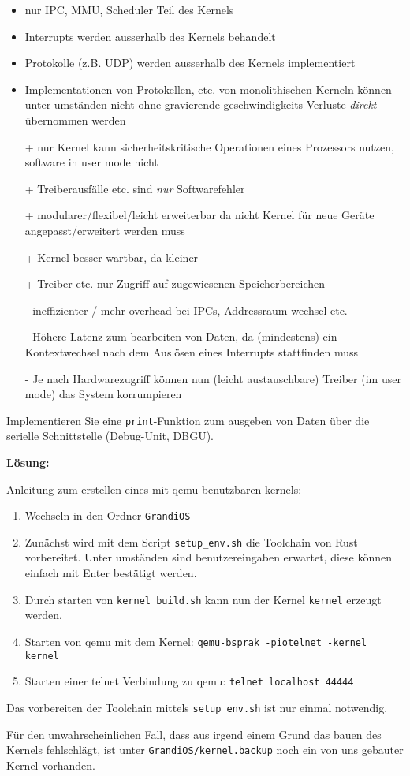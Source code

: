 \begin{description}
\begin{itemize}
  \item nur IPC, MMU, Scheduler Teil des Kernels
  \item Interrupts werden ausserhalb des Kernels behandelt
  \item Protokolle (z.B. UDP) werden ausserhalb des Kernels implementiert
  \item Implementationen von Protokellen, etc. von monolithischen Kerneln können unter umständen nicht ohne gravierende geschwindigkeits Verluste \emph{direkt} übernommen werden
  \item[+] nur Kernel kann sicherheitskritische Operationen eines Prozessors nutzen, software in user mode nicht
  \item[+] Treiberausfälle etc. sind \emph{nur} Softwarefehler
  \item[+] modularer/flexibel/leicht erweiterbar da nicht Kernel für neue Geräte angepasst/erweitert werden muss
  \item[+] Kernel besser wartbar, da kleiner
  \item[+] Treiber etc. nur Zugriff auf zugewiesenen Speicherbereichen
  \item[-] ineffizienter / mehr overhead bei IPCs, Addressraum wechsel etc.
  \item[-] Höhere Latenz zum bearbeiten von Daten, da (mindestens) ein Kontextwechsel nach dem Auslösen eines Interrupts stattfinden muss
  \item[-] Je nach Hardwarezugriff können nun (leicht austauschbare) Treiber (im user mode) das System korrumpieren
\end{itemize}



Implementieren Sie eine \texttt{print}-Funktion zum ausgeben von Daten über die serielle Schnittstelle (Debug-Unit, DBGU).

\textbf{Lösung:}

Anleitung zum erstellen eines mit qemu benutzbaren kernels:
\begin{enumerate}
	\item Wechseln in den Ordner \texttt{GrandiOS}
	\item Zunächst wird mit dem Script \texttt{setup\_env.sh} die Toolchain von Rust vorbereitet. Unter umständen sind benutzereingaben erwartet, diese können einfach mit Enter bestätigt werden.
	\item Durch starten von \texttt{kernel\_build.sh} kann nun der Kernel \texttt{kernel} erzeugt werden.
	\item Starten von qemu mit dem Kernel: \texttt{qemu-bsprak -piotelnet -kernel kernel}
	\item Starten einer telnet Verbindung zu qemu: \texttt{telnet localhost 44444}
\end{enumerate}
Das vorbereiten der Toolchain mittels \texttt{setup\_env.sh} ist nur einmal notwendig.

Für den unwahrscheinlichen Fall, dass aus irgend einem Grund das bauen des Kernels fehlschlägt, ist unter \texttt{GrandiOS/kernel.backup} noch ein von uns gebauter Kernel vorhanden.

\end{description}

